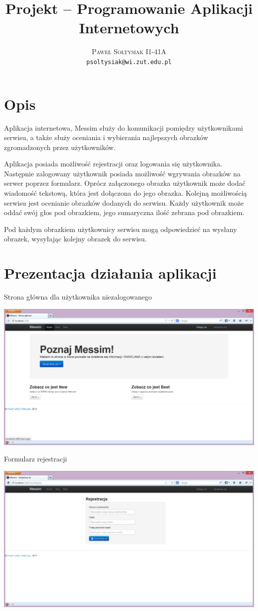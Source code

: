 \documentclass{article}
\title{Projekt -- Programowanie Aplikacji Internetowych}
\author{\textsc{Paweł Sołtysiak I1-41A} \\ \texttt{psoltysiak@wi.zut.edu.pl}}
\begin{document}
\maketitle

\section{Opis}
Aplikacja internetowa, Messim służy do komunikacji pomiędzy użytkownikami serwisu, a także służy oceniania i wybierania najlepszych obrazków zgromadzonych przez użytkowników.

Aplikacja posiada możliwość rejestracji oraz logowania się użytkownika. Następnie zalogowany użytkownik posiada możliwość wgrywania obrazków na serwer poprzez formularz. Oprócz załączonego obrazka użytkownik może dodać wiadomość tekstową, która jest dołączona do jego obrazka. Kolejną możliwością serwisu jest ocenianie obrazków dodanych do serwisu. Każdy użytkownik może oddać swój głos pod obrazkiem, jego sumaryczna ilość zebrana pod obrazkiem.

Pod każdym obrazkiem użytkownicy serwisu mogą odpowiedzieć na wysłany obrazek, wysyłając kolejny obrazek do serwisu.


\section{Prezentacja działania aplikacji}
Strona główna dla użytkownika niezalogowanego

\includegraphics[width=\textwidth]{screenshots/home_page_not_singup}

Formularz rejestracji

\includegraphics[width=\textwidth]{screenshots/register_page}
\end{document}
